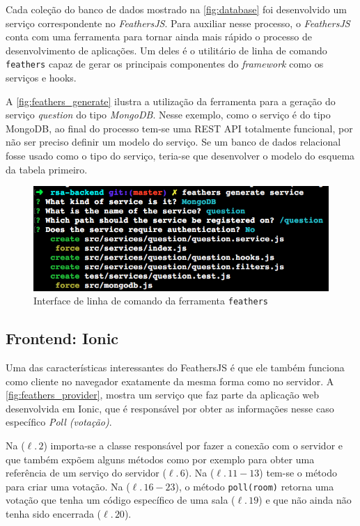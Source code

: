 Cada coleção do banco de dados mostrado na \autoref{fig:database} foi desenvolvido um
serviço correspondente no \textit{FeathersJS}. Para auxiliar nesse processo, o \textit{FeathersJS} conta com
uma ferramenta para tornar ainda mais rápido o processo de desenvolvimento de aplicações.
Um deles é o utilitário de linha de comando \texttt{feathers} capaz de gerar
os principais componentes do \textit{framework} como os serviços e hooks.

A \autoref{fig:feathers_generate} ilustra a utilização da ferramenta para a geração do serviço
\textit{question} do tipo \textit{MongoDB}. Nesse exemplo, como o serviço é do tipo MongoDB, ao
final do processo tem-se uma REST API totalmente funcional, por não ser preciso definir um modelo do serviço.
Se um banco de dados relacional fosse usado como o tipo do serviço, teria-se que desenvolver o modelo do esquema da tabela primeiro.

\begin{figure}[!ht]
  \centering
  \caption{Interface de linha de comando da ferramenta \texttt{feathers}}
  \label{fig:feathers_generate}
  \includegraphics[scale=0.6,valign=t]{imagens/feathers_generate}
  \doautor
\end{figure}

\subsection{Frontend: Ionic}

Uma das características interessantes do FeathersJS é que ele também funciona
como cliente no navegador exatamente da mesma forma como no servidor.
A \autoref{fig:feathers_provider}, mostra um serviço que faz parte da aplicação web desenvolvida em Ionic,
que é responsável por obter as informações nesse caso específico \textit{Poll (votação)}.

Na ($\ell.\,2$) importa-se a classe responsável por fazer a conexão com o servidor e que também
expõem alguns métodos como por exemplo para obter uma referência de um serviço do servidor ($\ell.\,6$). Na ($\ell.\,11-13$)
tem-se o método para criar uma votação. Na ($\ell.\,16-23$), o método \texttt{poll(room)} retorna uma votação
que tenha um código específico de uma sala ($\ell.\,19$) e que não ainda não tenha sido encerrada ($\ell.\,20$).

